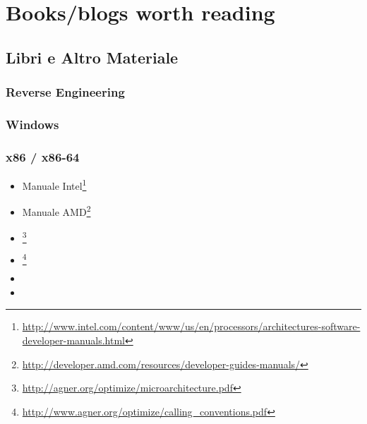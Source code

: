 \chapter{Books/blogs worth reading}

\section{Libri e Altro Materiale}

\subsection{Reverse Engineering}



\subsection{Windows}



\subsection{\CCpp}



\subsection{x86 / x86-64}

\label{x86_manuals}
\begin{itemize}
\item Manuale Intel\footnote{\AlsoAvailableAs \url{http://www.intel.com/content/www/us/en/processors/architectures-software-developer-manuals.html}}

\item Manuale AMD\footnote{\AlsoAvailableAs \url{http://developer.amd.com/resources/developer-guides-manuals/}}

\item \AgnerFog{}\footnote{\AlsoAvailableAs \url{http://agner.org/optimize/microarchitecture.pdf}}

\item \AgnerFogCC{}\footnote{\AlsoAvailableAs \url{http://www.agner.org/optimize/calling_conventions.pdf}}

\item \IntelOptimization

\item \AMDOptimization
\end{itemize}

